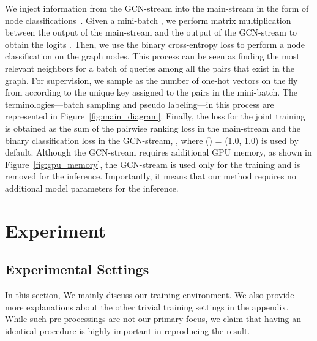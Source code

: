 \documentclass[10pt,twocolumn,letterpaper]{article}
\begin{document}
We inject information from the GCN-stream into the main-stream in the form of node classifications~\cite{chen2019multi}. Given a mini-batch , we perform matrix multiplication between the output of the main-stream  and the output of the GCN-stream  to obtain the logits . Then, we use the binary cross-entropy loss to perform a node classification on the  graph nodes. This process can be seen as finding the most relevant neighbors for a batch of queries among all the  pairs that exist in the graph. For supervision, we sample  as the number of one-hot vectors  on the fly from  according to the unique key assigned to the pairs in the mini-batch. The terminologies---batch sampling and pseudo labeling---in this process are represented in Figure~\ref{fig:main_diagram}. Finally, the loss for the joint training is obtained as the sum of the pairwise ranking loss in the main-stream and the binary classification loss in the GCN-stream, , where () = (1.0, 1.0) is used by default. Although the GCN-stream requires additional GPU memory, as shown in Figure~\ref{fig:gpu_memory}, the GCN-stream is used only for the training and is removed for the inference. Importantly, it means that our method requires no additional model parameters for the inference.

\section{Experiment}

\subsection{Experimental Settings}
In this section, We mainly discuss our training environment. We also provide more explanations about the other trivial training settings in the appendix. While such pre-processings are not our primary focus, we claim that having an identical procedure is highly important in reproducing the result.
\end{document}
